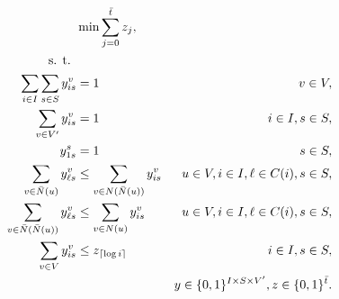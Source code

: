 \begin{subequations}\label{mod:partition}
\begin{align}
\notag &\min\sum\limits_{j=0}^{\bar{t}}z_j,\\
\notag \text{s. t. } \\
\label{mod:part:nodeBelongs} \sum\limits_{i\in I}\sum\limits_{s\in S}y^v_{is} & = 1 & v\in V,\\
\label{mod:part:treeHasIJ} \sum\limits_{v\in V'}y^v_{is} & = 1 & i\in I,s\in S,\\
\label{mod:part:source1} y_{1s}^s & = 1  & s\in S,\\
\label{mod:part:followArcsA}\sum\limits_{v\in \bar{N}(u)}y^v_{\ell s}&\leq \sum\limits_{v\in N(\bar{N}(u))}y_{is}^{v} & u\in V,i\in I,\ell\in C(i), s\in S,  \\
\label{mod:part:followArcsB}\sum\limits_{v\in \bar{N}(\bar{N}(u))}y^v_{\ell s}&\leq \sum\limits_{v\in N(u)} y_{is}^{v} & u\in V,i\in I,\ell\in C(i), s\in S,\\
\label{mod:part:yzrel}\sum\limits_{v\in V}y^v_{is} & \leq z_{\lceil\log i\rceil} & i\in I,s\in S,\\
\label{mod:part:dim}&&y \in \{0,1\}^{I\times S\times V'}, z\in \{0,1\}^{\bar{t}}.
\end{align}~
\end{subequations}

